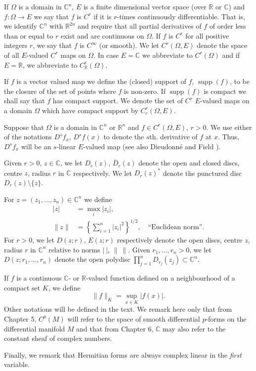 If $\Omega$ is a domain in $\mathbb C^n$, $E$ is a finite dimensional vector space (over $\mathbb R$ or $\mathbb C$) and $f:\Omega\to E$ we say that $f$ is $C^r$ if it is $r$-times continuously differentiable. That is, we identify $\mathbb C^n$ with $\mathbb R^{2n}$ and require that all partial derivatives of $f$ of order less than or equal to $r$ exist and are continuous on $\Omega$. If $f$ is $C^r$ for all positive integers $r$, we say that $f$ is $C^\infty$ (or smooth). We let $C^r(\Omega,E)$ denote the space of all $E$-valued $C^r$ maps on $\Omega$. In case $E=\mathbb C$ we abbreviate to $C^r(\Omega)$ and if $E=\mathbb R$, we abbreviate to $C^r_{\mathbb R}(\Omega)$.

If $f$ is a vector valued map we define the (closed) support of $f$, $\operatorname{supp}(f)$, to be the closure of the set of points where $f$ is non-zero. If $\operatorname{supp}(f)$ is compact we shall say that $f$ has compact support. We denote the set of $C^r$ $E$-valued maps on a domain $\Omega$ which have compact support by $C_c^r(\Omega,E)$.

Suppose that $\Omega$ is a domain in $\mathbb C^n$ or $\mathbb R^n$ and $f\in C^r(\Omega,E)$, $r>0$. We use either of the notations $D^s f_x$, $D^s f(x)$ to denote the $s$th. derivative of $f$ at $x$. Thus, $D^s f_x$ will be an $s$-linear $E$-valued map (see also Dieudonn\'e \cite{bib:I:dieudonne-j:1} and Field \cite{bib:I:field-m-j:1}).

Given $r>0$, $z\in\mathbb C$, we let $D_r(z)$, $\overline D_r(z)$ denote the open and closed discs, centre $z$, radius $r$ in $\mathbb C$ respectively. We let $D_r(z)^*$ denote the punctured disc $D_r(z)\setminus\{z\}$.

For $z=(z_1,\ldots,z_n)\in\mathbb C^n$ we define
\begin{align*}
|z|&=\max_i|z_i|,\\
\|z\|&=\left\{\sum_{i=1}^n|z_i|^2\right\}^{1/2},\quad\text{``Euclidean norm''}.
\end{align*}
For $r>0$, we let $D(z;r)$, $E(z;r)$ respectively denote the open discs, centre $z$, radius $r$ in $\mathbb C^n$ relative to norms $|\ |$, $\|\ \|$. Given $r_1,\ldots,r_n>0$, we let $D(z;r_1,\ldots,r_n)$ denote the open polydisc $\prod_{j=1}^nD_{r_j}(z_j)\subset\mathbb C^n$.

If $f$ is a continuous $\mathbb C$- or $\mathbb R$-valued function defined on a neighbourhood of a compact set $K$, we define
\[ \|f\|_K=\sup_{x\in K}|f(x)|. \]
Other notations will be defined in the text. We remark here only that from Chapter 5, $C^p(M)$ will refer to the space of smooth differential $p$-forms on the differential manifold $M$ and that from Chapter 6, $\mathbb C$ may also refer to the constant sheaf of complex numbers.

Finally, we remark that Hermitian forms are always complex linear in the \emph{first} variable.
\clearpage
\endgroup

